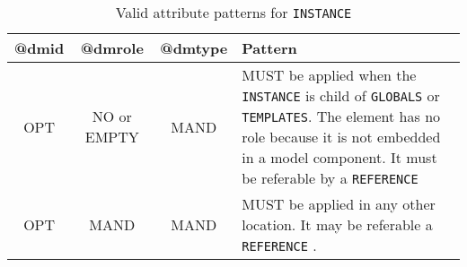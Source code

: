 \begin{table}[!htbp]
\small
\centering
\begin{tabulary}{\linewidth}{|c|c|c|J|}
    \hline 
        \textbf{@dmid} &
        \textbf{@dmrole} &
        \textbf{@dmtype} &
        \textbf{Pattern}\\
    \hline      \hline  
        OPT &           
        NO or EMPTY&           
        MAND &           
        MUST be applied when the  \texttt{INSTANCE} is child of \texttt{GLOBALS} or \texttt{TEMPLATES}. The element has no role because it is not embedded in a model component. It must be referable by a \texttt{REFERENCE}  \\
    \hline   
        OPT &           
        MAND &           
        MAND &           
        MUST be applied in any other location. It may be referable a \texttt{REFERENCE} . \\
   \hline 
\end{tabulary}
     \caption{Valid attribute patterns for  \texttt{INSTANCE}} 
     \label{tbl:instance-pattern}
 \end{table}       
\newpage

 
